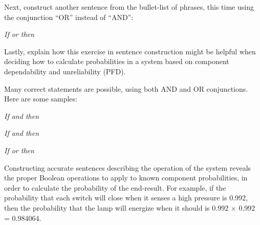\vskip 10pt

Next, construct another sentence from the bullet-list of phrases, this time using the conjunction ``OR'' instead of ``AND'':

\vskip 10pt

\centerline{\it If \underbar{\hskip 100pt} or \underbar{\hskip 100pt} then \underbar{\hskip 100pt}}

\vskip 10pt

Lastly, explain how this exercise in sentence construction might be helpful when deciding how to calculate probabilities in a system based on component dependability and unreliability (PFD).

\vskip 10pt







Many correct statements are possible, using both AND and OR conjunctions.  Here are some samples:

\vskip 10pt

{\it If  and  then }

\vskip 10pt

{\it If  and  then }

\vskip 10pt

{\it If  or  then }

\vskip 10pt

Constructing accurate sentences describing the operation of the system reveals the proper Boolean operations to apply to known component probabilities, in order to calculate the probability of the end-result.  For example, if the probability that each switch will close when it senses a high pressure is 0.992, then the probability that the lamp will energize when it should is 0.992 $\times$ 0.992 = 0.984064.











